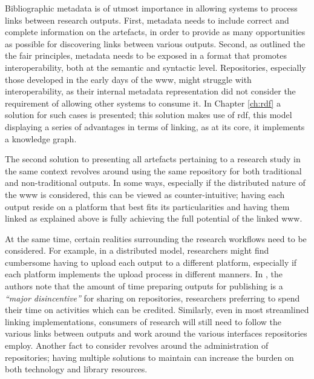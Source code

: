 Bibliographic metadata is of utmost importance in allowing systems to process links between research outputs. First, metadata needs to include correct and complete information on the artefacts, in order to provide as many opportunities as possible for discovering links between various outputs. Second, as outlined the the \gls{fair} principles, metadata needs to be exposed in a format that promotes interoperability, both at the semantic and syntactic level. Repositories, especially those developed in the early days of the \gls{www}, might struggle with interoperability, as their internal metadata representation did not consider the requirement of allowing other systems to consume it. In Chapter \ref{ch:rdf} a solution for such cases is presented; this solution makes use of \gls{rdf}, this model displaying a series of advantages in terms of linking, as at its core, it implements a knowledge graph.

The second solution to presenting all artefacts pertaining to a research study in the same context revolves around using the same repository for both traditional and non-traditional outputs. In some ways, especially if the distributed nature of the \gls{www} is considered, this can be viewed as counter-intuitive; having each output reside on a platform that best fits its particularities and having them linked as explained above is fully achieving the full potential of the linked \gls{www}.

At the same time, certain realities surrounding the research workflows need to be considered. For example, in a distributed model, researchers might find cumbersome having to upload each output to a different platform, especially if each platform implements the upload process in different manners. In \cite{austin}, the authors note that the amount of time preparing outputs for publishing is a \emph{``major disincentive''} for sharing on repositories, researchers preferring to spend their time on activities which can be credited. Similarly, even in most streamlined linking implementations, consumers of research will still need to follow the various links between outputs and work around the various interfaces repositories employ. Another fact to consider revolves around the administration of repositories; having multiple solutions to maintain can increase the burden on both technology and library resources.



